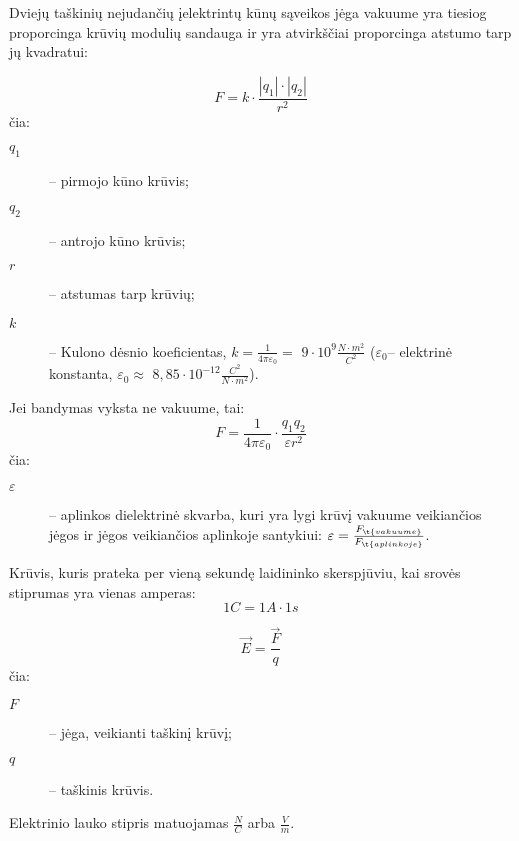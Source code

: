 \begin{defn}
  Dviejų taškinių nejudančių įelektrintų kūnų sąveikos jėga vakuume
  yra tiesiog proporcinga krūvių modulių sandauga ir yra atvirkščiai
  proporcinga atstumo tarp jų kvadratui:

  \begin{equation}
    F = k \cdot \frac{|q_{1}| \cdot |q_{2}|}{r^{2}}
    \label{eq:kulono_desnis}
  \end{equation}
  čia:
  \begin{description}
    \item[$q_{1}$] – pirmojo kūno krūvis;
    \item[$q_{2}$] – antrojo kūno krūvis;
    \item[$r$] – atstumas tarp krūvių;
    \item[$k$] – Kulono dėsnio koeficientas,
      $k = \frac{1}{4 \pi \varepsilon_{0}} =$
      $9 \cdot 10^{9} \frac{N \cdot m^{2}}{C^{2}}$
      ($\varepsilon_{0}$– elektrinė konstanta, $\varepsilon_{0} \approx $
      $8,85 \cdot 10^{-12} \frac{C^{2}}{N \cdot m^{2}}$).
  \end{description}

  Jei bandymas vyksta ne vakuume, tai:
  \begin{equation*}
    F =
      \frac{1}{4 \pi \varepsilon_{0}} \cdot
      \frac{q_{1}q_{2}}{\varepsilon r^{2}}
  \end{equation*}
  čia:
  \begin{description}
    \item[$\varepsilon$] – aplinkos dielektrinė skvarba, kuri yra lygi
      krūvį vakuume veikiančios jėgos ir jėgos veikiančios
      aplinkoje santykiui:
      $\varepsilon = \frac{F_{\t{vakuume}}}{F_{\t{aplinkoje}}}$.
  \end{description}
\end{defn}

\begin{defn}[Kulonas]
  Krūvis, kuris prateka per vieną sekundę laidininko skerspjūviu, kai
  srovės stiprumas yra vienas amperas:
  \begin{equation*}
    1 C = 1A \cdot 1s
  \end{equation*}
\end{defn}

\begin{defn}
  \begin{equation*}
    \vec{E} = \frac{\vec{F}}{q}
  \end{equation*}
  čia:
  \begin{description}
    \item[$F$] – jėga, veikianti taškinį krūvį;
    \item[$q$] – taškinis krūvis.
  \end{description}
  Elektrinio lauko stipris matuojamas $\frac{N}{C}$ arba $\frac{V}{m}$.
\end{defn}


